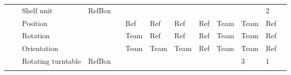 \begin{landscape}
\begin{table}[h!]
\begin{tabular}{|l|l|l|l*{9}{|P{1cm}}|}
     \hhline{~-----------} \hhline{~-----------}
     & 
         & Shelf unit       & RefBox   &       &       &       &       &       &       &    & 2   \\ \hhline{~~----------}
      &  & Position         &          &       &   Ref  &   Ref  &  Ref  &  Ref   &   Team  & Team & Ref  \\ \hhline{~~----------}
      &  & Rotation         &          &       &  Team &   Ref   &  Ref    &  Ref    &   Team  & Team& Ref   \\ \hhline{~~-----------}
      &  & Orientation      &          &       &  Team &   Team  &  Team   &  Ref    &  Team  &Team & Ref   \\ \hhline{~~-----------}
      &  & Rotating turntable& RefBox  &       &       &       &       &       &        & 3  & 1   \\ 
      \hhline{~-----------} \hhline{~-----------}
      & 

\end{tabular}
\end{table}
\end{landscape}

